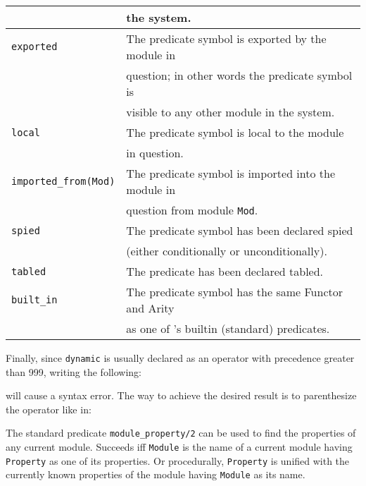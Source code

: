 \begin{description}
\begin{center}
\begin{tabular}{||l|l||}
	&	the system.\\ \hline
	\hline
	{\tt exported}	&
		The predicate symbol is exported by the module in \\ 
	&	question; in other words the predicate symbol is \\
	&	visible to any other module in the system. \\ \hline
	{\tt local}	& 
		The predicate symbol is local to the module \\
	&	in question. \\ \hline
	{\tt imported\_from(Mod)}	& 
		The predicate symbol is imported into the module in \\
	&	question from module {\tt Mod}. \\ \hline
	\hline
	{\tt spied}		&
		The predicate symbol has been declared spied \\
	&	(either conditionally or unconditionally). \\ \hline
	\hline
	{\tt tabled}	& 
		The predicate has been declared tabled. \\ \hline
	\hline
	{\tt built\_in}	& 
		The predicate symbol has the same Functor and Arity \\
	&	as one of \ourprolog's builtin (standard) predicates. \\ \hline
    \end{tabular}
    \end{center}

    Finally, since {\tt dynamic} is usually declared as an operator with 
    precedence greater than 999, writing the following:


    will cause a syntax error. The way to achieve the desired result is to
    parenthesize the operator like in:



    The standard predicate {\tt module\_property/2} can be used to find the
    properties of any current module.
    Succeeds iff {\tt Module} is the name of a current module having 
    {\tt Property} as one of its properties. Or procedurally, {\tt Property}
    is unified with the currently known properties of the module having 
    {\tt Module} as its name.


\end{description}
